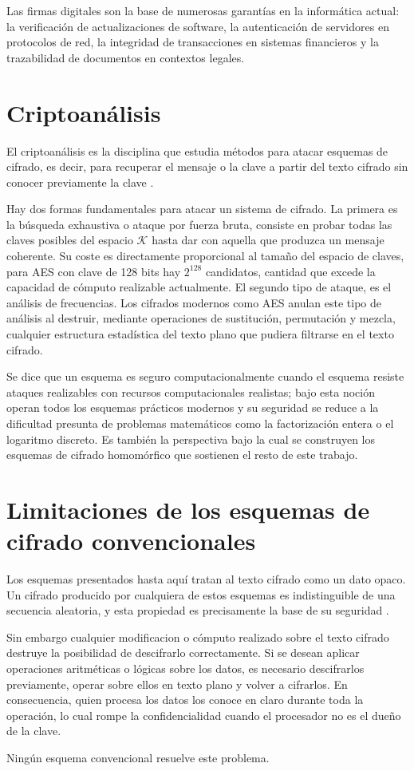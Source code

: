 Las firmas digitales son la base de numerosas garantías en la informática actual: la verificación de actualizaciones de software, la autenticación de servidores en protocolos de red, la integridad de transacciones en sistemas financieros y la trazabilidad de documentos en contextos legales.

\section{Criptoanálisis}

El criptoanálisis es la disciplina que estudia métodos para atacar esquemas de cifrado, es decir, para recuperar el mensaje o la clave a partir del texto cifrado sin conocer previamente la clave \cite{Dooley24}.

Hay dos formas fundamentales para atacar un sistema de cifrado. La primera es la búsqueda exhaustiva o ataque por fuerza bruta, consiste en probar todas las claves posibles del espacio $\mathcal{K}$ hasta dar con aquella que produzca un mensaje coherente. Su coste es directamente proporcional al tamaño del espacio de claves, para AES con clave de 128 bits hay $2^{128}$ candidatos, cantidad que excede la capacidad de cómputo realizable actualmente. El segundo tipo de ataque, es el análisis de frecuencias. Los cifrados modernos como AES anulan este tipo de análisis al destruir, mediante operaciones de sustitución, permutación y mezcla, cualquier estructura estadística del texto plano que pudiera filtrarse en el texto cifrado.

Se dice que un esquema es seguro computacionalmente cuando el esquema resiste ataques realizables con recursos computacionales realistas; bajo esta noción operan todos los esquemas prácticos modernos y su seguridad se reduce a la dificultad presunta de problemas matemáticos como la factorización entera o el logaritmo discreto. Es también la perspectiva bajo la cual se construyen los esquemas de cifrado homomórfico que sostienen el resto de este trabajo.

\section{Limitaciones de los esquemas de cifrado convencionales}

Los esquemas presentados hasta aquí tratan al texto cifrado como un dato opaco. Un cifrado producido por cualquiera de estos esquemas es indistinguible de una secuencia aleatoria, y esta propiedad es precisamente la base de su seguridad \cite{KatzLindell}.

Sin embargo cualquier modificacion o cómputo realizado sobre el texto cifrado destruye la posibilidad de descifrarlo correctamente. Si se desean aplicar operaciones aritméticas o lógicas sobre los datos, es necesario descifrarlos previamente, operar sobre ellos en texto plano y volver a cifrarlos. En consecuencia, quien procesa los datos los conoce en claro durante toda la operación, lo cual rompe la confidencialidad cuando el procesador no es el dueño de la clave. 

Ningún esquema convencional resuelve este problema. 

